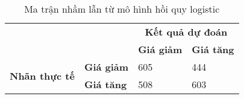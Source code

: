 \narrowlinespacing

\begin{table}[H] 
    \centering

    \begin{tabularx}{0.7\textwidth}{
    p{}%
    p{}%
    p{}
    p{}
    }
        
        \toprule\midrule
        \textbf{} & \textbf{} & \multicolumn{2}{c}{\textbf{Kết quả dự đoán}} \\
        \cmidrule(rl){3-4}
        \textbf{} & \textbf{} & \textbf{Giá giảm} & \textbf{Giá tăng} \\
        \midrule
        
        
        \multirow{2}{*}{\textbf{Nhãn thực tế }}  & \textbf{Giá giảm} & 605 & 444\\
        & \textbf{Giá tăng} & 508 & 603 \\
        \midrule
        \bottomrule
        
    \end{tabularx}
    \label{tab:lr_confusion_matrix}
    \caption{Ma trận nhầm lẫn từ mô hình hồi quy logistic}
\end{table}

\normallinespacing
